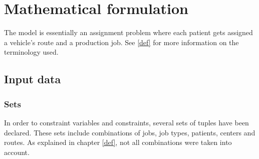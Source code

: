 \chapter{Mathematical formulation}
\label{matmod}

The model is essentially an assignment problem where each patient gets assigned a vehicle's route and a production job. See \ref{def} for more information on the terminology used.

\section{Input data}

\subsection{Sets}



In order to constraint variables and constraints, several sets of tuples have been declared. These sets include combinations of jobs, job types, patients, centers and routes. As explained in chapter \ref{def}, not all combinations were taken into account.

